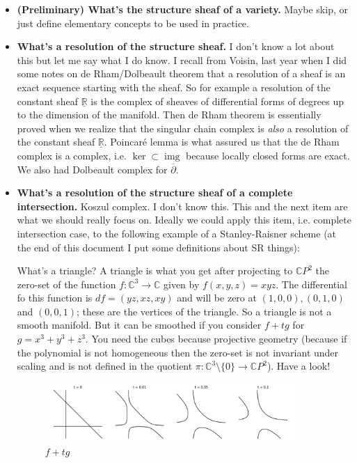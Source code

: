 \begin{itemize}
	\item \textbf{(Preliminary) What's the structure sheaf of a variety.} Maybe skip, or just define elementary concepts to be used in practice.
	\item \textbf{What's a resolution of the structure sheaf.} I don't know a lot about this but let me say what I do know. I recall from Voisin, last year when I did some notes on de Rham/Dolbeault theorem that a resolution of a sheaf is an exact sequence starting with the sheaf. So for example a resolution of the constant sheaf \(\underline{\mathbb{R}}\) is the complex of sheaves of differential forms of degrees up to the dimension of the manifold. Then de Rham theorem is essentially proved when we realize that the singular chain complex is \textit{also} a resolution of the constant sheaf \(\underline{\mathbb{R}}\). Poincaré lemma is what assured us that the de Rham complex is a complex, i.e. \(\ker \subset \operatorname{img}\) because locally closed forms are exact. We also had Dolbeault complex for \(\overline{\partial}\).
	\item \textbf{What's a resolution of the structure sheaf of a complete intersection.} Koszul complex. I don't know this. This and the next item are what we should really focus on. Ideally we could apply this item, i.e. complete intersection case, to the following example of a Stanley-Raisner scheme (at the end of this document I put some definitions about SR things): 
\begin{example}\leavevmode
What's a triangle? A triangle is what you get after projecting to \(\mathbb{C}P^{2}\) the zero-set of the function \(f:\mathbb{C}^3 \to \mathbb{C}\) given by \(f(x,y,z)=xyz\). The differential fo this function is \(df=(yz,xz,xy)\) and will be zero at \((1,0,0),(0,1,0)\) and \((0,0,1)\); these are the vertices of the triangle. So a triangle is not a smooth manifold. But it can be smoothed if you consider \(f+tg\) for \(g=x^3+y^3+z^3\). You need the cubes because projective geometry (because if the polynomial is not homogeneous then the zero-set is not invariant under scaling and is not defined in the quotient \(\pi:\mathbb{C}^{3}\setminus\{0\}\to \mathbb{C}P^{2}\)). Have a look!

\begin{figure}[H]
	\centering
	\includegraphics[width=0.9\textwidth]{fig8.png}
	\caption*{\(f+tg\)}
\end{figure}
\end{example}	


\end{itemize}
